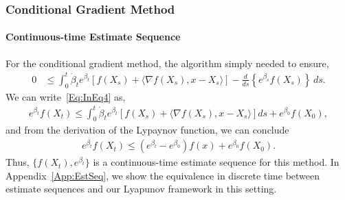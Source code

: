 \documentclass[11pt]{article}
\theoremstyle{plain}
\begin{document}
%
%
%
\subsubsection{Conditional Gradient Method} 
\paragraph{Continuous-time Estimate Sequence}
For the conditional gradient method, the algorithm simply needed to ensure,
\begin{align}\label{Eq:InEq4}
0 &\leq \int_0^t\dot \beta_t e^{\beta_t}  [f(X_s)+ \langle \nabla f(X_s), x - X_s \rangle] -  \frac{d}{ds}\left\{ e^{ \beta_s}  f(X_s)\right\}\,ds.
\end{align}
 We can write~\eqref{Eq:InEq4} as, 
\begin{align*}
e^{ \beta_t}  f(X_t) \leq \int_0^t\dot \beta_t e^{\beta_t}  [f(X_s)+ \langle \nabla f(X_s), x - X_s \rangle]ds   + e^{\beta_0} f(X_0),
\end{align*}
and from the derivation of the Lypaynov function, we can conclude
\begin{align*}
e^{\beta_t} f(X_t) \leq  (e^{\beta_t} - e^{\beta_0}) f(x) + e^{\beta_0}f(X_0).
\end{align*}
Thus, $\{f(X_t),e^{\beta_t}\}$ is a continuous-time estimate sequence for this method. In Appendix~\ref{App:EstSeq}, we show the equivalence in discrete time between estimate sequences and our Lyapunov framework in this setting.
%

%
%
\end{document}
